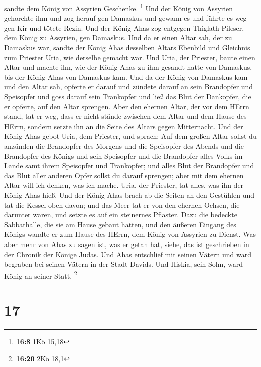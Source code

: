 sandte dem König von Assyrien Geschenke. \footnote{\textbf{16:8} 1Kö
  15,18}  Und der König von Assyrien gehorchte ihm und zog
herauf gen Damaskus und gewann es und führte es weg gen Kir und tötete
Rezin.  Und der König Ahas zog entgegen Thiglath-Pileser,
dem König zu Assyrien, gen Damaskus. Und da er einen Altar sah, der zu
Damaskus war, sandte der König Ahas desselben Altars Ebenbild und
Gleichnis zum Priester Uria, wie derselbe gemacht war.  Und
Uria, der Priester, baute einen Altar und machte ihn, wie der König Ahas
zu ihm gesandt hatte von Damaskus, bis der König Ahas von Damaskus kam.
 Und da der König von Damaskus kam und den Altar sah,
opferte er darauf  und zündete darauf an sein Brandopfer
und Speisopfer und goss darauf sein Trankopfer und ließ das Blut der
Dankopfer, die er opferte, auf den Altar sprengen.  Aber
den ehernen Altar, der vor dem HErrn stand, tat er weg, dass er nicht
stände zwischen dem Altar und dem Hause des HErrn, sondern setzte ihn an
die Seite des Altars gegen Mitternacht.  Und der König Ahas
gebot Uria, dem Priester, und sprach: Auf dem großen Altar sollst du
anzünden die Brandopfer des Morgens und die Speisopfer des Abends und
die Brandopfer des Königs und sein Speisopfer und die Brandopfer alles
Volks im Lande samt ihrem Speisopfer und Trankopfer; und alles Blut der
Brandopfer und das Blut aller anderen Opfer sollst du darauf sprengen;
aber mit dem ehernen Altar will ich denken, was ich mache. 
Uria, der Priester, tat alles, was ihn der König Ahas hieß.
 Und der König Ahas brach ab die Seiten an den Gestühlen
und tat die Kessel oben davon; und das Meer tat er von den ehernen
Ochsen, die darunter waren, und setzte es auf ein steinernes Pflaster.
 Dazu die bedeckte Sabbathalle, die sie am Hause gebaut
hatten, und den äußeren Eingang des Königs wandte er zum Hause des
HErrn, dem König von Assyrien zu Dienst.  Was aber mehr von
Ahas zu sagen ist, was er getan hat, siehe, das ist geschrieben in der
Chronik der Könige Judas.  Und Ahas entschlief mit seinen
Vätern und ward begraben bei seinen Vätern in der Stadt Davids. Und
Hiskia, sein Sohn, ward König an seiner Statt. \footnote{\textbf{16:20}
  2Kö 18,1}

\hypertarget{section-5}{%
\section{17}\label{section-5}}

